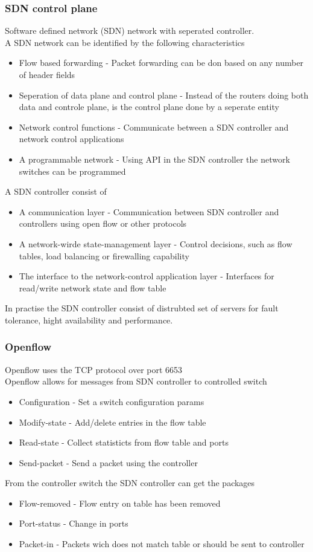\documentclass[12pt, a4paper]{article}
\begin{document}
			\subsubsection{SDN control plane}
				Software defined network (SDN) network with seperated controller.\\
				A SDN network can be identified by the following characteristics
				\begin{itemize}
					\item Flow based forwarding - Packet forwarding can be don based on any number of header fields
					\item Seperation of data plane and control plane - Instead of the routers doing both data and controle plane, is the control plane done by a seperate entity
					\item Network control functions - Communicate between a SDN controller and network control applications
					\item A programmable network - Using API in the SDN controller the network switches can be programmed
				\end{itemize}
				A SDN controller consist of 
				\begin{itemize}
					\item A communication layer - Communication between SDN controller and controllers using open flow or other protocols
					\item A network-wirde state-management layer - Control decisions, such as flow tables, load balancing or firewalling capability
					\item The interface to the network-control application layer - Interfaces for read/write network state and flow table
				\end{itemize}
				In practise the SDN controller consist of distrubted set of servers for fault tolerance, hight availability and performance.
			\subsubsection{Openflow}
				Openflow uses the TCP protocol over port 6653\\
				Openflow allows for messages from SDN controller to controlled switch 
				\begin{itemize}
					\item Configuration - Set a switch configuration params
					\item Modify-state - Add/delete entries in the flow table
					\item Read-state - Collect statisticts from flow table and ports
					\item Send-packet - Send a packet using the controller
				\end{itemize}
				From the controller switch the SDN controller can get the packages
				\begin{itemize}
					\item Flow-removed - Flow entry on table has been removed
					\item Port-status - Change in ports
					\item Packet-in - Packets wich does not match table or should be sent to controller
				\end{itemize}
				
\end{document}
